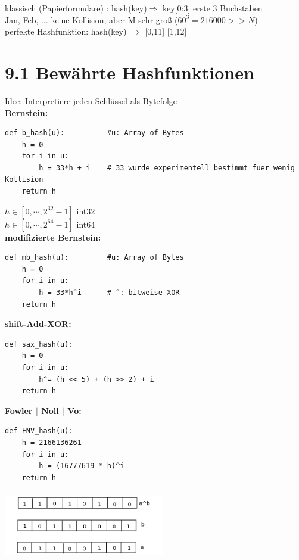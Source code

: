 klassisch (Papierformulare) : hash(key)$\Rightarrow$ key[0:3] erste 3 Buchstaben\\
\hspace*{5mm} Jan, Feb, ... \hspace*{2.3cm} keine Kollision, aber M sehr groß ($60^3 = 216000 >> N$) \\

perfekte Hashfunktion: hash(key) $\Rightarrow$ [0,11] \hspace*{5mm} [1,12] \\

\section*{9.1 Bewährte Hashfunktionen}
Idee: Interpretiere jeden Schlüssel als Bytefolge\\

\textbf{Bernstein:}
\begin{verbatim}
def b_hash(u):          #u: Array of Bytes
    h = 0
    for i in u:
        h = 33*h + i    # 33 wurde experimentell bestimmt fuer wenig Kollision
    return h
\end{verbatim}
$h \in [0, \cdots, 2^{32} -1]$ int32 \\
$h \in [0, \cdots, 2^{64} -1]$ int64 \\


\textbf{modifizierte Bernstein:}
\begin{verbatim}
def mb_hash(u):         #u: Array of Bytes
    h = 0
    for i in u:
        h = 33*h^i      # ^: bitweise XOR
    return h
\end{verbatim}

\textbf{shift-Add-XOR:}
\begin{verbatim}
def sax_hash(u):
    h = 0
    for i in u:
        h^= (h << 5) + (h >> 2) + i
    return h
\end{verbatim}

\textbf{Fowler $|$ Noll $|$ Vo:}
\begin{verbatim}
def FNV_hash(u):
    h = 2166136261
    for i in u:
        h = (16777619 * h)^i
    return h
\end{verbatim}
\includegraphics[width=7cm,height=3cm,keepaspectratio]{./Pictures/abArrays.png}

